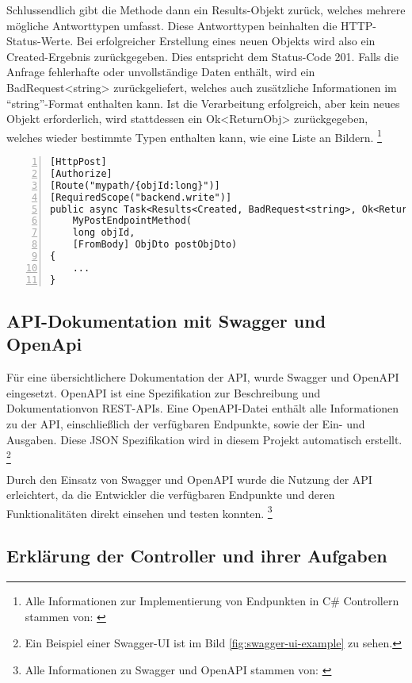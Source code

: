 Schlussendlich gibt die Methode dann ein Results-Objekt zurück, welches mehrere 
mögliche Antworttypen umfasst. Diese Antworttypen beinhalten die HTTP-Status-Werte.
Bei erfolgreicher Erstellung eines neuen Objekts wird also ein Created-Ergebnis zurückgegeben. 
Dies entspricht dem Status-Code 201. Falls die Anfrage fehlerhafte oder unvollständige Daten 
enthält, wird ein BadRequest<string> zurückgeliefert, welches auch zusätzliche Informationen
im ``string''-Format enthalten kann. Ist die Verarbeitung erfolgreich, aber kein neues Objekt 
erforderlich, wird stattdessen ein Ok<ReturnObj> zurückgegeben, welches wieder bestimmte
Typen enthalten kann, wie eine Liste an Bildern.
\footnote{Alle Informationen zur Implementierung von Endpunkten in C\# Controllern stammen von: \cite{MicrosoftCorporationaa} \cite{MicrosoftCorporationab}}

\begin{lstlisting}[numbers=left,caption={Beispiel eines Endpunkts},label={lst:endpoint-example}]
[HttpPost]
[Authorize]
[Route("mypath/{objId:long}")]
[RequiredScope("backend.write")]
public async Task<Results<Created, BadRequest<string>, Ok<ReturnObj>>> 
    MyPostEndpointMethod(
    long objId, 
    [FromBody] ObjDto postObjDto)
{
    ...
}
\end{lstlisting}

\subsection{API-Dokumentation mit Swagger und OpenApi}

Für eine übersichtlichere Dokumentation der API, wurde Swagger und OpenAPI eingesetzt.
OpenAPI ist eine Spezifikation zur Beschreibung und Dokumentationvon REST-APIs. Eine
OpenAPI-Datei enthält alle Informationen zu der API, einschließlich der verfügbaren 
Endpunkte, sowie der Ein- und Ausgaben. Diese JSON Spezifikation wird in diesem Projekt
automatisch erstellt.
\footnote{Ein Beispiel einer Swagger-UI ist im Bild \ref{fig:swagger-ui-example} zu sehen.}

Durch den Einsatz von Swagger und OpenAPI wurde die Nutzung der API erleichtert, 
da die Entwickler die verfügbaren Endpunkte und deren Funktionalitäten direkt 
einsehen und testen konnten. 
\footnote{Alle Informationen zu Swagger und OpenAPI stammen von: \cite{SmartBearSoftware}}

\subsection{Erklärung der Controller und ihrer Aufgaben}

